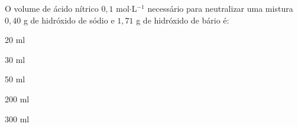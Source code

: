 O volume de ácido nítrico $0,1$ mol$\cdot$L$^{-1}$ necessário para neutralizar uma mistura $0,40$ g de hidróxido de sódio e $1,71$ g de hidróxido de bário é:

\begin{enumerate*}[label = (\alph*)]
	\item 20 ml
	\item 30 ml
	\item 50 ml
	\item 200 ml
	\item 300 ml
\end{enumerate*}

